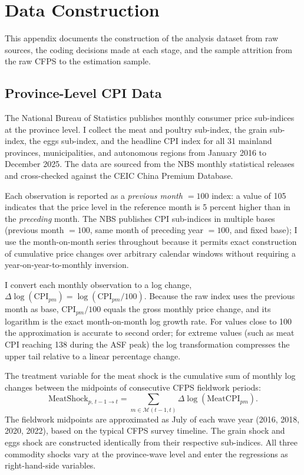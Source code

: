 
\section{Data Construction}\label{app:data}

This appendix documents the construction of the analysis
dataset from raw sources, the coding decisions made at each
stage, and the sample attrition from the raw CFPS to the
estimation sample.

\subsection{Province-Level CPI Data}

The National Bureau of Statistics publishes monthly consumer
price sub-indices at the province level.
I collect the meat and poultry sub-index, the grain sub-index,
the eggs sub-index, and the headline CPI index for all 31
mainland provinces, municipalities, and autonomous regions
from January 2016 to December 2025.
The data are sourced from the NBS monthly statistical releases
and cross-checked against the CEIC China Premium Database.

Each observation is reported as a \emph{previous month $= 100$}
index: a value of 105 indicates that the price level in the
reference month is 5 percent higher than in the \emph{preceding}
month.
The NBS publishes CPI sub-indices in multiple bases
(previous month $= 100$, same month of preceding year $= 100$,
and fixed base); I use the month-on-month series throughout
because it permits exact construction of cumulative price
changes over arbitrary calendar windows without requiring a
year-on-year-to-monthly inversion.

I convert each monthly observation to a log change,
$\Delta\log(\mathrm{CPI}_{pm}) = \log(\mathrm{CPI}_{pm}/100)$.
Because the raw index uses the previous month as base,
$\mathrm{CPI}_{pm}/100$ equals the gross monthly price change,
and its logarithm is the exact month-on-month log growth rate.
For values close to 100 the approximation is accurate to
second order; for extreme values (such as meat CPI reaching
138 during the ASF peak) the log transformation compresses
the upper tail relative to a linear percentage change.

The treatment variable for the meat shock is the cumulative
sum of monthly log changes between the midpoints of
consecutive CFPS fieldwork periods:
\[
  \mathrm{MeatShock}_{p,\,t-1\to t}
  = \sum_{m \in \mathcal{M}(t-1,t)}
    \Delta\log(\mathrm{MeatCPI}_{pm}).
\]
The fieldwork midpoints are approximated as July of each wave
year (2016, 2018, 2020, 2022), based on the typical CFPS
survey timeline.
The grain shock and eggs shock are constructed identically
from their respective sub-indices.
All three commodity shocks vary at the province-wave level
and enter the regressions as right-hand-side variables.


